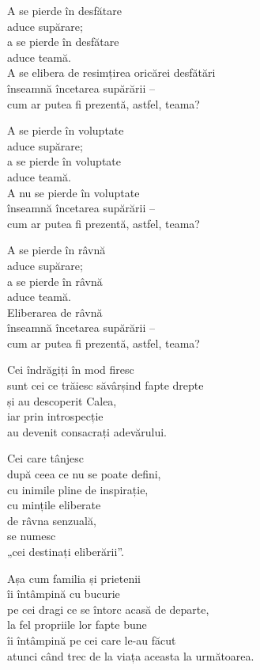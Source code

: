 A se pierde în desfătare\\
aduce supărare;\\
a se pierde în desfătare\\
aduce teamă.\\
A se elibera de resimțirea oricărei desfătări\\
înseamnă încetarea supărării –\\
cum ar putea fi prezentă, astfel, teama?


A se pierde în voluptate\\
aduce supărare;\\
a se pierde în voluptate\\
aduce teamă.\\
A nu se pierde în voluptate\\
înseamnă încetarea supărării –\\
cum ar putea fi prezentă, astfel, teama?



A se pierde în râvnă\\
aduce supărare;\\
a se pierde în râvnă\\
aduce teamă.\\
Eliberarea de râvnă  \\
înseamnă încetarea supărării –\\
cum ar putea fi prezentă, astfel, teama?


Cei îndrăgiți în mod firesc\\
sunt cei ce trăiesc săvârșind fapte drepte\\
și au descoperit Calea,\\
iar prin introspecție\\
au devenit consacrați adevărului.


Cei care tânjesc\\
după ceea ce nu se poate defini,\\
cu inimile pline de inspirație,\\
cu mințile eliberate\\
de râvna senzuală,\\
se numesc\\
„cei destinați eliberării”.


Așa cum familia și prietenii\\
îi întâmpină cu bucurie\\
pe cei dragi ce se întorc acasă de departe,\\
la fel propriile lor fapte bune\\
îi întâmpină pe cei care le-au făcut\\
atunci când trec de la viața aceasta la următoarea.
